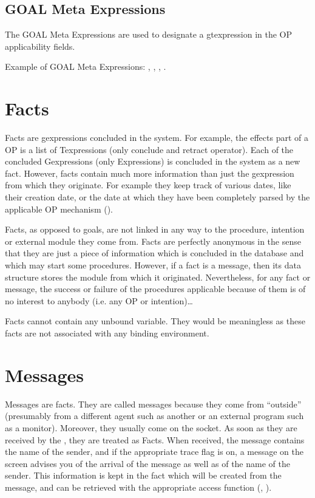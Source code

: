 \subsection{GOAL Meta Expressions}

The GOAL Meta Expressions are used to designate a gtexpression in the OP
applicability fields.

Example of GOAL Meta Expressions:\*
,\*
,\*
,\*
.

\section{Facts}

Facts are gexpressions concluded in the system. For example, the effects part
of a OP is a list of Texpressions (only conclude and retract operator). Each of
the concluded Gexpressions (only Expressions) is concluded in the system as a
new fact. However, facts contain much more information than just the
gexpression from which they originate. For example they keep track of various
dates, like their creation date, or the date at which they have been completely
parsed by the applicable OP mechanism ().

Facts, as opposed to goals, are not linked in any way to the procedure,
intention or external module they come from. Facts are perfectly anonymous in
the sense that they are just a piece of information which is concluded in the
database and which may start some procedures. However, if a fact is a message,
then its data structure stores the module from which it originated.
Nevertheless, for any fact or message, the success or failure of the procedures
applicable because of them is of no interest to anybody (i.e. any
OP or intention)\dots{}

Facts cannot contain any unbound variable. They would be meaningless as
these facts are not associated with any binding environment.

\section{Messages}

Messages are facts. They are called messages because they come from ``outside''
(presumably from a different agent such as another \CPK{} or an external
program such as a monitor). Moreover, they usually come on the \MPA{} socket. As
soon as they are received by the \CPK{}, they are treated as Facts. When
received, the message contains the name of the sender, and if the appropriate
trace flag is on, a message on the screen advises you of the arrival of the
message as well as of the name of the sender. This information is kept in the
fact which will be created from the message, and can be retrieved with the
appropriate access function (, ).


